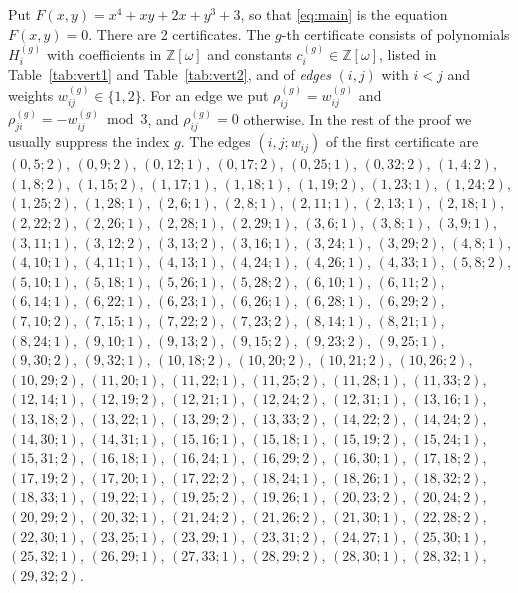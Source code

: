 \documentclass[11pt]{article}
\newcommand{\Z}{\mathbb{Z}}
\begin{document}
Put $F(x,y)=x^{4}+xy+2x+y^{3}+3$, so that \eqref{eq:main} is the equation $F(x,y)=0$. There are 2 certificates. The $g$-th certificate consists of polynomials $H^{(g)}_i$ with coefficients in $\Z[\omega]$ and constants $c^{(g)}_i\in\Z[\omega]$, listed in Table~\ref{tab:vert1} and Table~\ref{tab:vert2}, and of \emph{edges} $(i,j)$ with $i<j$ and weights $w^{(g)}_{ij}\in\{1,2\}$. For an edge we put $\rho^{(g)}_{ij}=w^{(g)}_{ij}$ and $\rho^{(g)}_{ji}=-w^{(g)}_{ij}\bmod3$, and $\rho^{(g)}_{ij}=0$ otherwise. In the rest of the proof we usually suppress the index $g$.
The edges $(i,j;w_{ij})$ of the first certificate are $(0,5;2)$, $(0,9;2)$, $(0,12;1)$, $(0,17;2)$, $(0,25;1)$, $(0,32;2)$, $(1,4;2)$, $(1,8;2)$, $(1,15;2)$, $(1,17;1)$, $(1,18;1)$, $(1,19;2)$, $(1,23;1)$, $(1,24;2)$, $(1,25;2)$, $(1,28;1)$, $(2,6;1)$, $(2,8;1)$, $(2,11;1)$, $(2,13;1)$, $(2,18;1)$, $(2,22;2)$, $(2,26;1)$, $(2,28;1)$, $(2,29;1)$, $(3,6;1)$, $(3,8;1)$, $(3,9;1)$, $(3,11;1)$, $(3,12;2)$, $(3,13;2)$, $(3,16;1)$, $(3,24;1)$, $(3,29;2)$, $(4,8;1)$, $(4,10;1)$, $(4,11;1)$, $(4,13;1)$, $(4,24;1)$, $(4,26;1)$, $(4,33;1)$, $(5,8;2)$, $(5,10;1)$, $(5,18;1)$, $(5,26;1)$, $(5,28;2)$, $(6,10;1)$, $(6,11;2)$, $(6,14;1)$, $(6,22;1)$, $(6,23;1)$, $(6,26;1)$, $(6,28;1)$, $(6,29;2)$, $(7,10;2)$, $(7,15;1)$, $(7,22;2)$, $(7,23;2)$, $(8,14;1)$, $(8,21;1)$, $(8,24;1)$, $(9,10;1)$, $(9,13;2)$, $(9,15;2)$, $(9,23;2)$, $(9,25;1)$, $(9,30;2)$, $(9,32;1)$, $(10,18;2)$, $(10,20;2)$, $(10,21;2)$, $(10,26;2)$, $(10,29;2)$, $(11,20;1)$, $(11,22;1)$, $(11,25;2)$, $(11,28;1)$, $(11,33;2)$, $(12,14;1)$, $(12,19;2)$, $(12,21;1)$, $(12,24;2)$, $(12,31;1)$, $(13,16;1)$, $(13,18;2)$, $(13,22;1)$, $(13,29;2)$, $(13,33;2)$, $(14,22;2)$, $(14,24;2)$, $(14,30;1)$, $(14,31;1)$, $(15,16;1)$, $(15,18;1)$, $(15,19;2)$, $(15,24;1)$, $(15,31;2)$, $(16,18;1)$, $(16,24;1)$, $(16,29;2)$, $(16,30;1)$, $(17,18;2)$, $(17,19;2)$, $(17,20;1)$, $(17,22;2)$, $(18,24;1)$, $(18,26;1)$, $(18,32;2)$, $(18,33;1)$, $(19,22;1)$, $(19,25;2)$, $(19,26;1)$, $(20,23;2)$, $(20,24;2)$, $(20,29;2)$, $(20,32;1)$, $(21,24;2)$, $(21,26;2)$, $(21,30;1)$, $(22,28;2)$, $(22,30;1)$, $(23,25;1)$, $(23,29;1)$, $(23,31;2)$, $(24,27;1)$, $(25,30;1)$, $(25,32;1)$, $(26,29;1)$, $(27,33;1)$, $(28,29;2)$, $(28,30;1)$, $(28,32;1)$, $(29,32;2)$.
\end{document}
